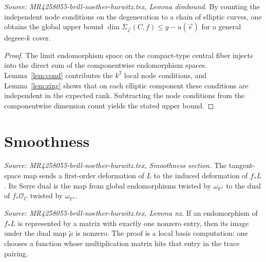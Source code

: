 \begin{lemma}
  \label{lem:dimbound}
  \textit{Source: MR4258055-brill-noether-hurwitz.tex, Lemma dimbound.}
  By counting the independent node conditions on the degeneration to a chain of elliptic curves, one obtains the global upper bound \(\dim \Sigma_{\vec e}(C,f)\le g-u(\vec e)\) for a general degree-\(k\) cover.
\end{lemma}

\begin{proof}
  The limit endomorphism space on the compact-type central fiber injects into the direct sum of the componentwise endomorphism spaces. Lemma~\ref{lem:cond} contributes the \(k^2\) local node conditions, and Lemma~\ref{lem:zing} shows that on each elliptic component these conditions are independent in the expected rank. Subtracting the node conditions from the componentwise dimension count yields the stated upper bound.
\end{proof}

\section{Smoothness}

\begin{definition}
  \label{def:deformation-map}
  \textit{Source: MR4258055-brill-noether-hurwitz.tex, Smoothness section.}
  The tangent-space map sends a first-order deformation of \(L\) to the induced deformation of \(f_*L\). Its Serre dual is the map from global endomorphisms twisted by \(\omega_{\mathbb P^1}\) to the dual of \(f_*\mathcal O_C\) twisted by \(\omega_{\mathbb P^1}\).
\end{definition}

\begin{lemma}
  \label{lem:nz}
  \textit{Source: MR4258055-brill-noether-hurwitz.tex, Lemma nz.}
  If an endomorphism of \(f_*L\) is represented by a matrix with exactly one nonzero entry, then its image under the dual map \(\tilde\mu\) is nonzero. The proof is a local basis computation: one chooses a function whose multiplication matrix hits that entry in the trace pairing.
\end{lemma}

